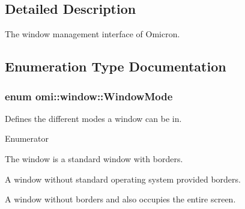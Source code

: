\subsection{Detailed Description}
The window management interface of Omicron. 

\subsection{Enumeration Type Documentation}
\subsubsection[{\texorpdfstring{Window\+Mode}{WindowMode}}]{\setlength{\rightskip}{0pt plus 5cm}enum {\bf omi\+::window\+::\+Window\+Mode}}\hypertarget{namespaceomi_1_1window_a096dc3d82796b93c067bca535fc0f94e}{}\label{namespaceomi_1_1window_a096dc3d82796b93c067bca535fc0f94e}


Defines the different modes a window can be in. 

\begin{Desc}
\item[Enumerator]\par
\begin{description}
\item[{\em 
k\+Mode\+Windowed\hypertarget{namespaceomi_1_1window_a096dc3d82796b93c067bca535fc0f94ea5cdfc02e040757fdb921a45d3158d518}{}\label{namespaceomi_1_1window_a096dc3d82796b93c067bca535fc0f94ea5cdfc02e040757fdb921a45d3158d518}
}]The window is a standard window with borders. \item[{\em 
k\+Mode\+Borderless\hypertarget{namespaceomi_1_1window_a096dc3d82796b93c067bca535fc0f94eac3d9c6d548d9fc4fb5025fcd82be4af6}{}\label{namespaceomi_1_1window_a096dc3d82796b93c067bca535fc0f94eac3d9c6d548d9fc4fb5025fcd82be4af6}
}]A window without standard operating system provided borders. \item[{\em 
k\+Mode\+Fullscreen\hypertarget{namespaceomi_1_1window_a096dc3d82796b93c067bca535fc0f94ea34eef49c0a3476e0687277537204a73d}{}\label{namespaceomi_1_1window_a096dc3d82796b93c067bca535fc0f94ea34eef49c0a3476e0687277537204a73d}
}]A window without borders and also occupies the entire screen. \end{description}
\end{Desc}
